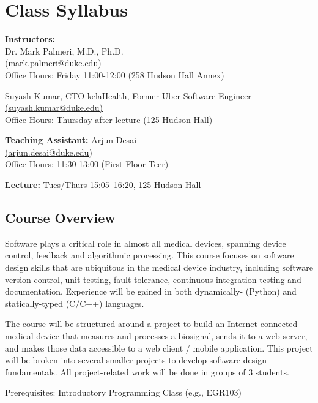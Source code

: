 



\section*{Class Syllabus}

{\bf Instructors:}\\
Dr. Mark Palmeri, M.D., Ph.D.\\
\href{mailto:mark.palmeri@duke.edu}{(mark.palmeri@duke.edu)}\\
Office Hours: Friday 11:00-12:00 (258 Hudson Hall Annex)

Suyash Kumar, CTO kelaHealth, Former Uber Software Engineer\\
\href{mailto:suyash.kumar@duke.edu}{(suyash.kumar@duke.edu)}\\
Office Hours: Thursday after lecture (125 Hudson Hall)

{\bf Teaching Assistant:}
Arjun Desai\\
\href{mailto:arjun.desai@duke.edu}{(arjun.desai@duke.edu)}\\
Office Hours: 11:30-13:00 (First Floor Teer)

{\bf Lecture:} Tues/Thurs 15:05--16:20, 125 Hudson Hall

\subsection*{Course Overview}
Software plays a critical role in almost all medical devices, spanning device control, feedback and algorithmic processing.  This course focuses on software design skills that are ubiquitous in the medical device industry, including software version control, unit testing, fault tolerance, continuous integration testing and documentation.  Experience will be gained in both dynamically- (Python) and statically-typed (C/C++) languages. 

The course will be structured around a project to build an Internet-connected medical device that measures and processes a biosignal, sends it to a web server, and makes those data accessible to a web client / mobile application.  This project will be broken into several smaller projects to develop software design fundamentals.  All project-related work will be done in groups of 3 students.

Prerequisites: Introductory Programming Class (e.g., EGR103)

